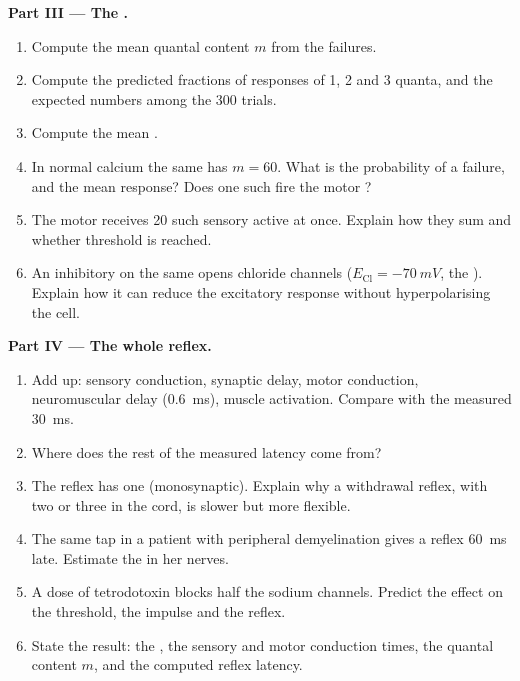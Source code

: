 \begin{problem}
\medskip
\noindent\textbf{Part III --- The .}
\begin{enumerate}[resume]
  \item Compute the mean quantal content $m$ from the failures.
  \item Compute the predicted fractions of responses of 1, 2 and 3
        quanta, and the expected numbers among the 300 trials.
  \item Compute the mean .
  \item In normal calcium the same  has $m = 60$. What is the
        probability of a failure, and the mean response? Does one
        such  fire the motor ?
  \item The motor  receives \num{20} such sensory 
        active at once. Explain how they sum and whether threshold is
        reached.
  \item An inhibitory  on the same  opens chloride
        channels ($E_{\mathrm{Cl}} = \qty{-70}{mV}$, the ). Explain how it can reduce the excitatory
        response without hyperpolarising the cell.
\end{enumerate}

\medskip
\noindent\textbf{Part IV --- The whole reflex.}
\begin{enumerate}[resume]
  \item Add up: sensory conduction, synaptic delay, motor conduction,
        neuromuscular delay (\qty{0.6}{ms}), muscle activation. Compare
        with the measured \qty{30}{ms}.
  \item Where does the rest of the measured latency come from?
  \item The reflex has one  (monosynaptic). Explain why a
        withdrawal reflex, with two or three  in the cord,
        is slower but more flexible.
  \item The same tap in a patient with peripheral demyelination
        gives a reflex \qty{60}{ms} late. Estimate the  in her nerves.
  \item A dose of tetrodotoxin blocks half the sodium channels.
        Predict the effect on the threshold, the impulse and the
        reflex.
  \item State the result: the , the sensory and
        motor conduction times, the quantal content $m$, and the
        computed reflex latency.
\end{enumerate}
\end{problem}
